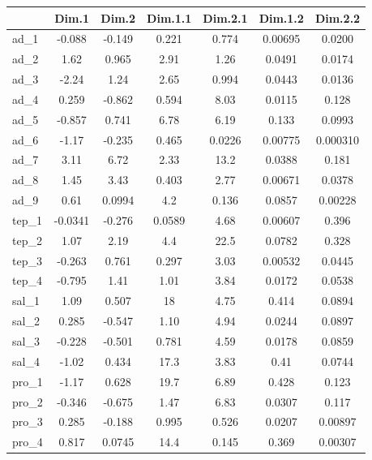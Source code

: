 \begin{tabular} {| l ||c |c |c |c |c |c |}  
 \hline 
   \  & Dim.1 & Dim.2 & Dim.1.1 & Dim.2.1 & Dim.1.2 & Dim.2.2 \\ \hline \hline 
ad_1 & -0.088 & -0.149 & 0.221 & 0.774 & 0.00695 & 0.0200 \\ \hline 
ad_2 & 1.62 & 0.965 & 2.91 & 1.26 & 0.0491 & 0.0174 \\ \hline 
ad_3 & -2.24 & 1.24 & 2.65 & 0.994 & 0.0443 & 0.0136 \\ \hline 
ad_4 & 0.259 & -0.862 & 0.594 & 8.03 & 0.0115 & 0.128 \\ \hline 
ad_5 & -0.857 & 0.741 & 6.78 & 6.19 & 0.133 & 0.0993 \\ \hline 
ad_6 & -1.17 & -0.235 & 0.465 & 0.0226 & 0.00775 & 0.000310 \\ \hline 
ad_7 & 3.11 & 6.72 & 2.33 & 13.2 & 0.0388 & 0.181 \\ \hline 
ad_8 & 1.45 & 3.43 & 0.403 & 2.77 & 0.00671 & 0.0378 \\ \hline 
ad_9 & 0.61 & 0.0994 & 4.2 & 0.136 & 0.0857 & 0.00228 \\ \hline 
tep_1 & -0.0341 & -0.276 & 0.0589 & 4.68 & 0.00607 & 0.396 \\ \hline 
tep_2 & 1.07 & 2.19 & 4.4 & 22.5 & 0.0782 & 0.328 \\ \hline 
tep_3 & -0.263 & 0.761 & 0.297 & 3.03 & 0.00532 & 0.0445 \\ \hline 
tep_4 & -0.795 & 1.41 & 1.01 & 3.84 & 0.0172 & 0.0538 \\ \hline 
sal_1 & 1.09 & 0.507 & 18 & 4.75 & 0.414 & 0.0894 \\ \hline 
sal_2 & 0.285 & -0.547 & 1.10 & 4.94 & 0.0244 & 0.0897 \\ \hline 
sal_3 & -0.228 & -0.501 & 0.781 & 4.59 & 0.0178 & 0.0859 \\ \hline 
sal_4 & -1.02 & 0.434 & 17.3 & 3.83 & 0.41 & 0.0744 \\ \hline 
pro_1 & -1.17 & 0.628 & 19.7 & 6.89 & 0.428 & 0.123 \\ \hline 
pro_2 & -0.346 & -0.675 & 1.47 & 6.83 & 0.0307 & 0.117 \\ \hline 
pro_3 & 0.285 & -0.188 & 0.995 & 0.526 & 0.0207 & 0.00897 \\ \hline 
pro_4 & 0.817 & 0.0745 & 14.4 & 0.145 & 0.369 & 0.00307 \\ \hline 
\end{tabular}  
